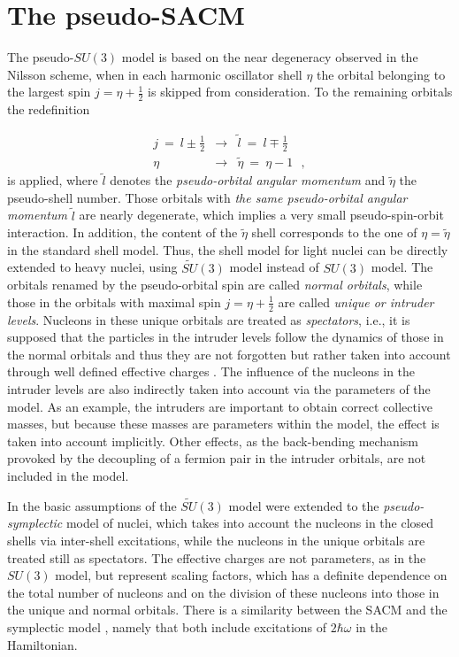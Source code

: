 \documentclass[12pt]{article}
\newcommand{\beqa}{\begin{eqnarray}}
\newcommand{\eeqa}{\end{eqnarray}}
\begin{document}
\section{The pseudo-SACM}
\label{pseudo-sacm}

The pseudo-$SU(3)$ model \cite{hecht,arima} 
is based on the  near degeneracy observed in the Nilsson scheme, when in
each harmonic oscillator shell $\eta$
the orbital belonging to the
largest spin $j=\eta + \frac{1}{2}$ is skipped from
consideration.
To the remaining orbitals the redefinition

\beqa
j ~=~ l\pm\frac{1}{2} & \rightarrow & {\tilde l}~=~ 
l\mp\frac{1}{2}
\nonumber \\
\eta & \rightarrow & {\tilde \eta} ~=~ \eta - 1
~~~,
\label{eq-1}
\eeqa
is applied, where ${\tilde l}$ denotes the
{\it pseudo-orbital angular momentum}
and ${\tilde \eta}$ the pseudo-shell number.
Those orbitals with {\it the same pseudo-orbital angular momentum} ${\tilde l}$ are 
nearly degenerate,
which implies a very small pseudo-spin-orbit interaction. In addition, the content
of the $\widetilde{\eta}$ shell corresponds to the one of $\eta = \widetilde{\eta}$ in the
standard shell model.
Thus, the shell model for light
nuclei can be directly extended to heavy nuclei, using $\widetilde{SU}(3)$ model instead of $SU(3)$ model. The orbitals renamed by the pseudo-orbital spin are called {\it normal orbitals},
while those in the orbitals with maximal spin $j=\eta+\frac{1}{2}$ are called
{\it unique  or intruder levels}. Nucleons in these unique orbitals are treated as {\it spectators},  i.e., it
is supposed that the particles in the intruder levels follow
the dynamics of those in the normal orbitals and
thus they are not forgotten but rather taken into account through well defined effective charges
\cite{pseudo-sympl}.
The influence of the nucleons in the intruder levels are also indirectly taken into account
via the parameters of the model. As an example, the intruders are important to obtain correct
collective masses, but because these masses are parameters within the model, the effect is taken
into account implicitly. Other effects, as the back-bending mechanism
provoked by the decoupling of a fermion pair in the intruder orbitals, are not included in the model. 

In \cite{pseudo-sympl} the basic assumptions of  the $\widetilde{SU}(3)$ model  were  extended to
the {\it pseudo-symplectic} model of nuclei, which takes into account the nucleons
in the closed shells via inter-shell excitations, while the nucleons in the unique
orbitals are treated still as spectators. The effective charges are not
parameters, as in the $SU(3)$ model, but 
represent scaling factors, which 
has a definite dependence on the total number of nucleons
and on the division of these nucleons into those in the unique and normal orbitals. There is a similarity between the SACM and the symplectic model \cite{rowe1}, namely that both include
excitations of $2\hbar\omega$ in the Hamiltonian.
\end{document}
